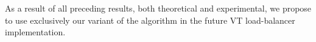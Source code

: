 As a result of all preceding results, both theoretical and
experimental, we propose to use exclusively our variant of the
algorithm in the future \textsf{VT} load-balancer implementation.